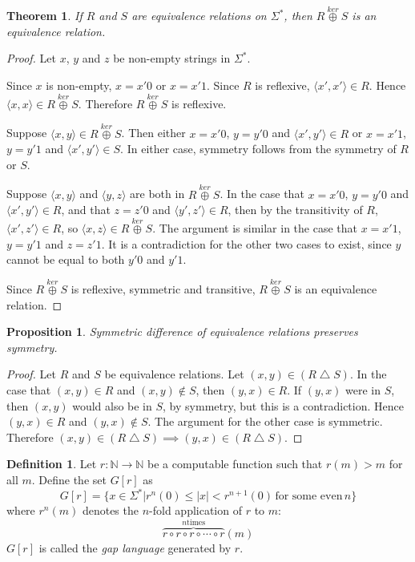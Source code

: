 \documentclass{article}
\newtheorem{theorem}{Theorem}[section]
\newtheorem{proposition}[proposition]{Proposition}
\theoremstyle{definition} \newtheorem{definition}[definition]{Definition}
\newcommand{\plain}[1]{\,\text{#1}\,} %
\newcommand{\kj}{\overset{ker}{\oplus}} %
\newcommand{\symdiff}{\bigtriangleup} %
\newcommand{\defn}[1]{\emph{#1}} %
\newcommand{\pair}[2]{\langle#1,#2\rangle} %
\begin{document}
\begin{theorem}
  If $R$ and $S$ are equivalence relations on $\Sigma^*$, then $R\kj S$ is an
  equivalence relation.
\end{theorem}
\begin{proof}

  Let $x$, $y$ and $z$ be non-empty strings in $\Sigma^*$.
  
  Since $x$ is non-empty, $x=x'0$ or $x=x'1$. Since $R$ is reflexive,
  $\pair{x'}{x'}\in R$. Hence $\pair{x}{x}\in R\kj S$. Therefore $R\kj S$ is
  reflexive.
  
  Suppose $\pair{x}{y}\in R\kj S$. Then either $x=x'0$, $y=y'0$ and
  $\pair{x'}{y'}\in R$ or $x=x'1$, $y=y'1$ and $\pair{x'}{y'}\in S$. In either
  case, symmetry follows from the symmetry of $R$ or $S$.

  Suppose $\pair{x}{y}$ and $\pair{y}{z}$ are both in $R\kj S$. In the case
  that $x=x'0$, $y=y'0$ and $\pair{x'}{y'}\in R$, and that $z=z'0$ and
  $\pair{y'}{z'}\in R$, then by the transitivity of $R$, $\pair{x'}{z'}\in R$,
  so $\pair{x}{z}\in R\kj S$. The argument is similar in the case that $x=x'1$,
  $y=y'1$ and $z=z'1$. It is a contradiction for the other two cases to exist,
  since $y$ cannot be equal to both $y'0$ and $y'1$.

  Since $R\kj S$ is reflexive, symmetric and transitive, $R\kj S$ is an
  equivalence relation.
\end{proof}

\begin{proposition}\label{prop:symdiff}
  Symmetric difference of equivalence relations preserves symmetry.
\end{proposition}
\begin{proof}
  Let $R$ and $S$ be equivalence relations. Let $(x,y)\in(R\symdiff S)$. In
  the case that $(x,y)\in R$ and $(x,y)\notin S$, then $(y,x)\in R$. If $(y,x)$
  were in $S$, then $(x,y)$ would also be in $S$, by symmetry, but this is a
  contradiction. Hence $(y,x)\in R$ and $(y,x)\notin S$. The argument for the
  other case is symmetric. Therefore $(x,y)\in(R\symdiff S)\implies
  (y,x)\in(R\symdiff S)$.
\end{proof}

\begin{definition}
  Let $r\colon\mathbb{N}\to\mathbb{N}$ be a computable function such that
  $r(m)>m$ for all $m$. Define the set $G[r]$ as
  \begin{displaymath}
    G[r]=\{x\in\Sigma^*|r^n(0)\leq|x|<r^{n+1}(0) \plain{for some even} n\}
  \end{displaymath}
  where $r^n(m)$ denotes the $n$-fold application of $r$ to $m$:
  \begin{displaymath}
    \overbrace{r\circ r\circ r\circ\cdots\circ r}^{n \text{times}}(m)
  \end{displaymath}
  $G[r]$ is called the \defn{gap language} generated by $r$.
\end{definition}
\end{document}

